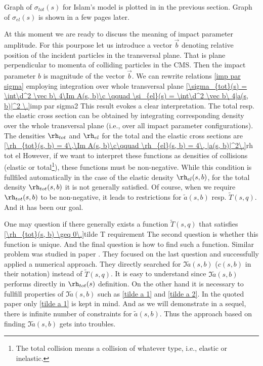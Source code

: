 Graph of $\sigma_{tot}(s)$ for Islam's model is plotted in \fg{}  in the previous section. Graph of $\sigma_{el}(s)$ is shown in \fg{}  a few pages later.

At this moment we are ready to discuss the meaning of impact parameter amplitude. For this pourpose let us introduce a vector $\vec b$ denoting relative position of the incident particles in the transversal plane. That is plane perpendicular to momenta of colliding particles in the CMS. Then the impact parameter $b$ is magnitude of the vector $\vec b$. We can rewrite relations \ref{imp par sigma} employing integration over whole transversal plane
\eqref{\sigma_{tot}(s) = \int\d^2 \vec b\ 4\Im A(s, b)\c \qquad \si_{el}(s) = \int\d^2 \vec b\ 4|a(s, b)|^2 \.}{imp par sigma2}
This result evokes a clear interpretation. The total resp. the elastic cross section can be obtained by integrating corresponding density over the whole transversal plane (i.e., over all impact parameter configurations). The densities $\rh_{tot}$ and $\rh_{el}$ for the total and the elastic cross sections are
\eqref{\rh_{tot}(s, b) = 4\,\Im A(s, b)\c\qquad \rh_{el}(s, b) = 4\, |a(s, b)|^2\.}{rh tot el}
However, if we want to interpret these functions as densities of collisions (elastic or total\footnote{The total collision means a collision of whatever type, i.e., elastic or inelastic.}), these functions must be non-negative. While this condition is fullfiled automatically in the case of the elastic density $\rh_{el}(s, b)$, for the total density $\rh_{tot}(s, b)$ it is not generally satisfied. Of course, when we require $\rh_{tot}(s, b)$ to be non-negative, it leads to restrictions for $\tilde a(s, b)$ resp. $\tilde T(s, q)$. And it has been our goal.

One may question if there generally exists a function $\tilde T(s, q)$ that satisfies
\eqref{\rh_{tot}(s, b) \geq 0\.}{tilde T requirement}
The second question is whether this function is unique. And the final question is how to find such a function. Similar problem was studied in paper . 
They focused on the last question and successfully applied a numerical approach. They directly searched for $\Im\tilde a(s, b)$ ($c(s, b)$ in their notation) instead of $\tilde T(s, q)$. It is easy to understand since $\Im\tilde a(s, b)$ performs directly in $\rh_{tot}(s)$ definition. On the other hand it is necessary to fullfill properties of $\Im\tilde a(s, b)$ such as \ref{tilde a 1} and \ref{tilde a 2}. In the quoted paper only \equ{} \ref{tilde a 1} is kept in mind. And as we will demonstrate in a sequel, there is infinite number of constraints for $\tilde a(s, b)$. Thus the approach based on finding $\Im\tilde a(s, b)$ gets into troubles. 

